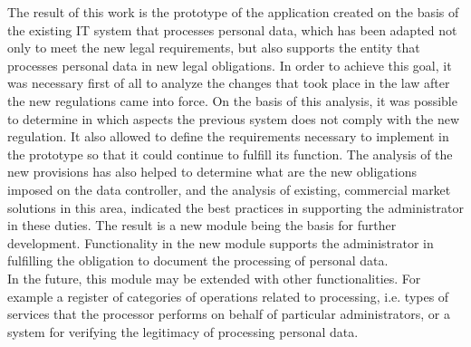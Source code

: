 \documentclass[en, noamssymb]{mgr}
\begin{document}
\indent  The result of this work is the prototype of the application created on the basis of the existing IT system that processes personal data, which has been adapted not only to meet the new legal requirements, but also supports the entity that processes personal data in new legal obligations. In order to achieve this goal, it was necessary first of all to analyze the changes that took place in the law after the new regulations came into force. On the basis of this analysis, it was possible to determine in which aspects the previous system does not comply with the new regulation. It also allowed to define the requirements necessary to implement in the prototype so that it could continue to fulfill its function. The analysis of the new provisions has also helped to determine what are the new obligations imposed on the data controller, and the analysis of existing, commercial market solutions in this area, indicated the best practices in supporting the administrator in these duties. The result is a new module being the basis for further development. Functionality in the new module supports the administrator in fulfilling the obligation to document the processing of personal data.\\
\indent In the future, this module may be extended with other functionalities. For example a register of categories of operations related to processing, i.e. types of services that the processor performs on behalf of particular administrators, or a system for verifying the legitimacy of processing personal data.


\listoffigures
\end{document}
